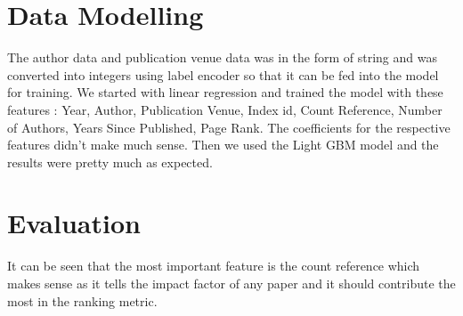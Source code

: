 \documentclass[a4paper, 11pt]{article}
\begin{document}
\section*{Data Modelling}

The author data and publication venue data was in the form of string and was converted into integers using label encoder so that it can be fed into the model for training. We started with linear regression and trained the model with these features :   Year, Author, Publication Venue, Index id, Count Reference, Number of Authors, Years Since Published, Page Rank. 
The coefficients for the respective features didn't make much sense. Then we used the Light GBM model and the results were pretty much as expected. 


\section*{Evaluation}


It can be seen that the most important feature is the count reference which makes sense as it tells the impact factor of any paper and it should contribute the most in the ranking metric.
\end{document}
